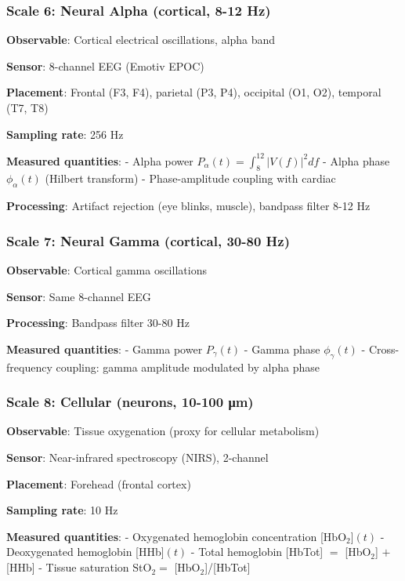\documentclass[11pt,onecolumn]{article}
\begin{document}
\subsubsection{Scale 6: Neural Alpha (cortical, 8-12 Hz)}

\textbf{Observable}: Cortical electrical oscillations, alpha band

\textbf{Sensor}: 8-channel EEG (Emotiv EPOC)

\textbf{Placement}: Frontal (F3, F4), parietal (P3, P4), occipital (O1, O2), temporal (T7, T8)

\textbf{Sampling rate}: 256 Hz

\textbf{Measured quantities}:
- Alpha power $P_\alpha(t) = \int_{8}^{12} |V(f)|^2 df$
- Alpha phase $\phi_\alpha(t)$ (Hilbert transform)
- Phase-amplitude coupling with cardiac

\textbf{Processing}: Artifact rejection (eye blinks, muscle), bandpass filter 8-12 Hz

\subsubsection{Scale 7: Neural Gamma (cortical, 30-80 Hz)}

\textbf{Observable}: Cortical gamma oscillations

\textbf{Sensor}: Same 8-channel EEG

\textbf{Processing}: Bandpass filter 30-80 Hz

\textbf{Measured quantities}:
- Gamma power $P_\gamma(t)$
- Gamma phase $\phi_\gamma(t)$
- Cross-frequency coupling: gamma amplitude modulated by alpha phase

\subsubsection{Scale 8: Cellular (neurons, 10-100 μm)}

\textbf{Observable}: Tissue oxygenation (proxy for cellular metabolism)

\textbf{Sensor}: Near-infrared spectroscopy (NIRS), 2-channel

\textbf{Placement}: Forehead (frontal cortex)

\textbf{Sampling rate}: 10 Hz

\textbf{Measured quantities}:
- Oxygenated hemoglobin concentration [HbO$_2$]$(t)$
- Deoxygenated hemoglobin [HHb]$(t)$
- Total hemoglobin [HbTot] $= $ [HbO$_2$] $+$ [HHb]
- Tissue saturation StO$_2 = $ [HbO$_2$]/[HbTot]
\end{document}
